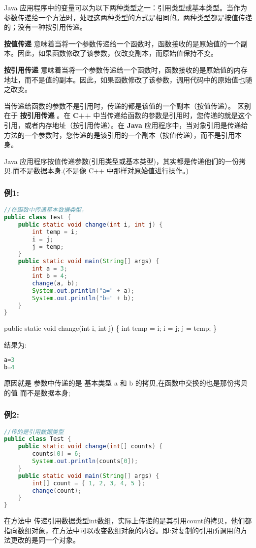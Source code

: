 \documentclass[10pt,b5paper]{article}
\begin{document}
Java 应用程序中的变量可以为以下两种类型之一：引用类型或基本类型。当作为参数传递给一个方法时，处理这两种类型的方式是相同的。两种类型都是按值传递的；没有一种按引用传递。 

\textbf{按值传递} 意味着当将一个参数传递给一个函数时，函数接收的是原始值的一个副本。因此，如果函数修改了该参数，仅改变副本，而原始值保持不变。

\textbf{按引用传递} 意味着当将一个参数传递给一个函数时，函数接收的是原始值的内存地址，而不是值的副本。因此，如果函数修改了该参数，调用代码中的原始值也随之改变。 

当传递给函数的参数不是引用时，传递的都是该值的一个副本（按值传递）。 区别在于 \textbf{按引用传递} 。在 \textbf{C++} 中当传递给函数的参数是引用时，您传递的就是这个引用，或者内存地址（按引用传递）。在 \textbf{Java} 应用程序中，当对象引用是传递给方法的一个参数时，您传递的是该引用的一个副本（按值传递），而不是引用本身。 

Java 应用程序按值传递参数(引用类型或基本类型)，其实都是传递他们的一份拷贝.而不是数据本身.(不是像 C++ 中那样对原始值进行操作。) 

\subsubsection{例1:}
\label{sec-1-5-1}
\begin{lstlisting}[language=java]
//在函数中传递基本数据类型，
public class Test {  
    public static void change(int i, int j) {  
        int temp = i;  
        i = j;  
        j = temp;  
    }  
    public static void main(String[] args) {  
        int a = 3;  
        int b = 4;  
        change(a, b);  
        System.out.println("a=" + a);  
        System.out.println("b=" + b);  
    }  
}  
\end{lstlisting}
public static void change(int i, int j) \{
        int temp = i;
        i = j;
        j = temp;
\}

结果为:  
\begin{lstlisting}[language=java]
a=3
b=4
\end{lstlisting}
原因就是 参数中传递的是 基本类型 a 和 b 的拷贝,在函数中交换的也是那份拷贝的值 而不是数据本身; 
\subsubsection{例2:}
\label{sec-1-5-2}
\begin{lstlisting}[language=java]
//传的是引用数据类型
public class Test {  
    public static void change(int[] counts) {  
        counts[0] = 6;  
        System.out.println(counts[0]);  
    }  
    public static void main(String[] args) {  
        int[] count = { 1, 2, 3, 4, 5 };  
        change(count);  
    }  
}  
\end{lstlisting}
在方法中 传递引用数据类型int数组，实际上传递的是其引用count的拷贝，他们都指向数组对象，在方法中可以改变数组对象的内容。即:对复制的引用所调用的方法更改的是同一个对象。 
\end{document}
